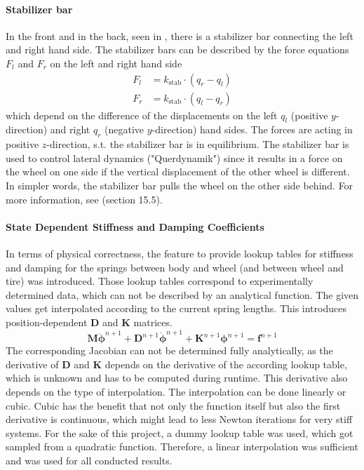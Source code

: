 \paragraph{Stabilizer bar}
In the front and in the back, seen in , there is a stabilizer bar connecting the left and right hand side. The stabilizer bars can be described by the force equations $F_l$ and $F_r$ on the left and right hand side
\begin{align}
	F_l &= k_\mathrm{stab} \cdot (q_r - q_l)\\
	F_r &= k_\mathrm{stab} \cdot (q_l - q_r)	
\end{align}
which depend on the difference of the displacements on the left $q_l$ (positive $y$-direction) and right $q_r$ (negative $y$-direction) hand sides.
The forces are acting in positive $z$-direction, s.t. the stabilizer bar is in equilibrium. 
The stabilizer bar is used to control lateral dynamics ("Querdynamik") since it results in a force on the wheel on one side if the vertical displacement of the other wheel is different. 
In simpler words, the stabilizer bar pulls the wheel on the other side behind.
For more information, see \cite{mitschke2014} (section 15.5).


\paragraph{State Dependent Stiffness and Damping Coefficients}\label{par:NonlinearSpring}
In terms of physical correctness, the feature to provide lookup tables for stiffness and damping for the springs between body and wheel (and between wheel and tire) was introduced. Those lookup tables correspond to experimentally determined data, which can not be described by an analytical function. The given values get interpolated according to the current spring lengths. This introduces position-dependent $\boldsymbol{D}$ and $\boldsymbol{K}$ matrices.
\begin{equation}\label{eq:EOMnonlin}
	\boldsymbol{M} \ddot{\boldsymbol{\phi}}^{n+1}+ \boldsymbol{D}^{n+1} \dot{\boldsymbol{\phi}}^{n+1} + \boldsymbol{K}^{n+1}\boldsymbol{\phi}^{n+1}=\boldsymbol{f}^{n+1}
\end{equation}
The corresponding Jacobian can not be determined fully analytically, as the derivative of $\boldsymbol{D}$ and $\boldsymbol{K}$ depends on the derivative of the according lookup table, which is unknown and has to be computed during runtime. This derivative also depends on the type of interpolation. The interpolation can be done linearly or cubic. Cubic has the benefit that not only the function itself but also the first derivative is continuous, which might lead to less Newton iterations for very stiff systems. For the sake of this project, a dummy lookup table was used, which got sampled from a quadratic function. Therefore, a linear interpolation was sufficient and was used for all conducted results.

